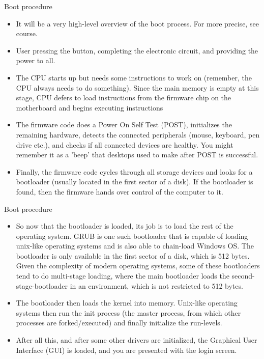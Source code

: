 \documentclass[usenames,dvipsnames,10pt,aspectratio=169]{beamer}
\begin{document}
\begin{frame}{Boot procedure}
    \begin{itemize}
        \item It will be a very high-level overview of the boot process. For more precise, see  course.
        \item User pressing the button, completing the electronic circuit, and providing the power to all.
        \item The CPU starts up but needs some instructions to work on (remember, the CPU always needs to do something). Since the main memory is empty at this stage, CPU defers to load instructions from the firmware chip on the motherboard and begins executing instructions
        \item The firmware code does a Power On Self Test (POST), initializes the remaining hardware, detects the connected peripherals (mouse, keyboard, pen drive etc.), and checks if all connected devices are healthy. You might remember it as a 'beep' that desktops used to make after POST is successful.
        \item Finally, the firmware code cycles through all storage devices and looks for a bootloader (usually located in the first sector of a disk). If the bootloader is found, then the firmware hands over control of the computer to it.
    \end{itemize}
\end{frame}

\begin{frame}{Boot procedure}
    \begin{itemize}
        \item So now that the bootloader is loaded, its job is to load the rest of the operating system. GRUB is one such bootloader that is capable of loading unix-like operating systems and is also able to chain-load Windows OS. The bootloader is only available in the first sector of a disk, which is 512 bytes. Given the complexity of modern operating systems, some of these bootloaders tend to do multi-stage loading, where the main bootloader loads the second-stage-bootloader in an environment, which is not restricted to 512 bytes.
        \item The bootloader then loads the kernel into memory. Unix-like operating systems then run the init process (the master process, from which other processes are forked/executed) and finally initialize the run-levels.
        \item After all this, and after some other drivers are initialized, the Graphical User Interface (GUI) is loaded, and you are presented with the login screen.
    \end{itemize}
\end{frame}
\end{document}

